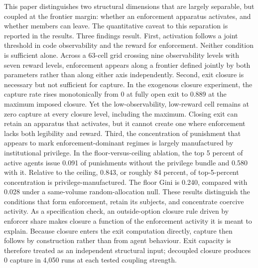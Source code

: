 \documentclass[12pt]{article}
\begin{document}
This paper distinguishes two structural dimensions that are largely separable, but coupled at the frontier margin: whether an enforcement apparatus activates, and whether members can leave. The quantitative caveat to this separation is reported in the results. Three findings result. First, activation follows a joint threshold in code observability and the reward for enforcement. Neither condition is sufficient alone. Across a 63-cell grid crossing nine observability levels with seven reward levels, enforcement appears along a frontier defined jointly by both parameters rather than along either axis independently. Second, exit closure is necessary but not sufficient for capture. In the exogenous closure experiment, the capture rate rises monotonically from 0 at fully open exit to 0.889 at the maximum imposed closure. Yet the low-observability, low-reward cell remains at zero capture at every closure level, including the maximum. Closing exit can retain an apparatus that activates, but it cannot create one where enforcement lacks both legibility and reward. Third, the concentration of punishment that appears to mark enforcement-dominant regimes is largely manufactured by institutional privilege. In the floor-versus-ceiling ablation, the top 5 percent of active agents issue 0.091 of punishments without the privilege bundle and 0.580 with it. Relative to the ceiling, 0.843, or roughly 84 percent, of top-5-percent concentration is privilege-manufactured. The floor Gini is 0.240, compared with 0.028 under a same-volume random-allocation null. These results distinguish the conditions that form enforcement, retain its subjects, and concentrate coercive activity. As a specification check, an outside-option closure rule driven by enforcer share makes closure a function of the enforcement activity it is meant to explain. Because closure enters the exit computation directly, capture then follows by construction rather than from agent behaviour. Exit capacity is therefore treated as an independent structural input; decoupled closure produces 0 capture in 4,050 runs at each tested coupling strength.
\end{document}
